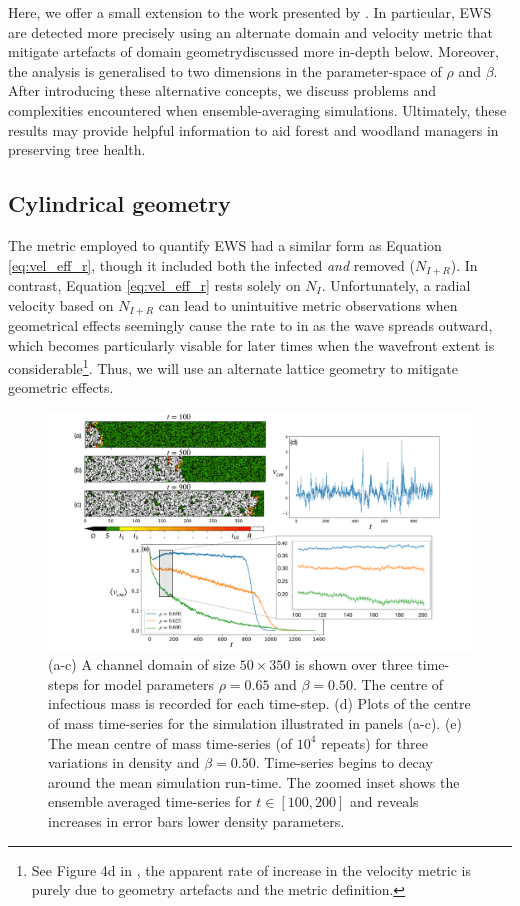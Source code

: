 Here, we offer a small extension to the work presented by \cite{OROZCOFUENTES201912}. In particular, EWS are detected more precisely using an alternate domain and velocity metric that mitigate artefacts of domain geometry\textemdash discussed more in-depth below. Moreover, the analysis is generalised to two dimensions in the parameter-space of $\rho$ and $\beta$. After introducing these alternative concepts, we discuss problems and complexities encountered when ensemble-averaging simulations. Ultimately, these results may provide helpful information to aid forest and woodland managers in preserving tree health.  

\subsection{Cylindrical geometry}
\label{sec:cylindrical-geometry}

The metric \cite{OROZCOFUENTES201912} employed to quantify EWS had a similar form as Equation \ref{eq:vel_eff_r},
though it included both the infected \textit{and} removed ($N_{I+R}$). In contrast, Equation \ref{eq:vel_eff_r} rests solely on $N_I$. 
Unfortunately, a radial velocity based on $N_{I+R}$ can lead to unintuitive metric observations when geometrical effects seemingly cause the rate to in as the wave spreads outward, which
becomes particularly visable for later times when the wavefront extent is considerable\footnote{
See Figure 4d in \cite{OROZCOFUENTES201912}, the apparent rate of increase in the velocity metric is purely due to geometry artefacts and the metric definition.}.
Thus, we will use an alternate lattice geometry to mitigate geometric effects.

\begin{figure}
    \centering
    \includegraphics[scale=0.30]{chapter4/figures/figure1-channel-domain.pdf}
    \caption{
    (a-c) A channel domain of size $50\times350$ is shown over three time-steps for model parameters $\rho=0.65$ and $\beta=0.50$. 
    The centre of infectious mass is recorded for each time-step. 
    (d) Plots of the centre of mass time-series for the simulation illustrated in panels (a-c). 
    (e) The mean centre of mass time-series (of $10^4$ repeats) for three variations in density and $\beta=0.50$. 
    Time-series begins to decay around the mean simulation run-time.  
    The zoomed inset shows the ensemble averaged time-series for $t\in[100, 200]$ and reveals increases in error bars lower density parameters.
    }
    \label{fig:ews-primer}
\end{figure}

